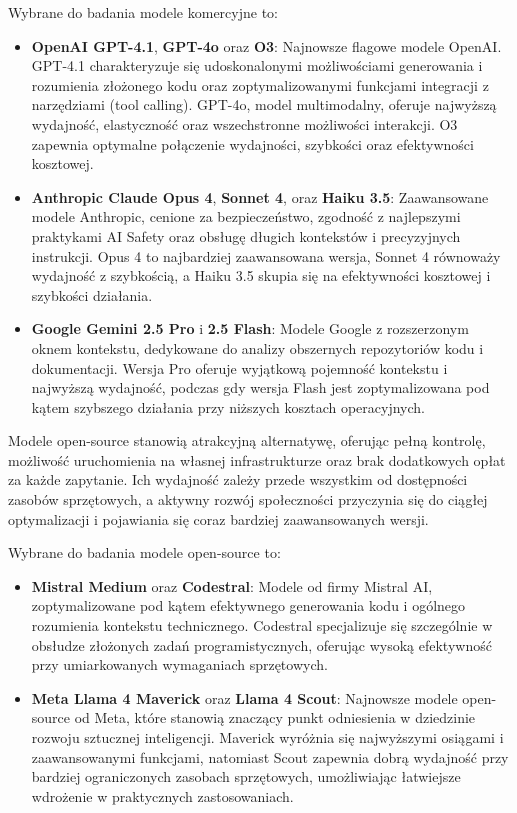 Wybrane do badania modele komercyjne to:

\begin{itemize}
	\item \textbf{OpenAI GPT-4.1}, \textbf{GPT-4o} oraz \textbf{O3}: Najnowsze flagowe modele OpenAI. GPT-4.1 charakteryzuje się udoskonalonymi możliwościami generowania i rozumienia złożonego kodu oraz zoptymalizowanymi funkcjami integracji z narzędziami (tool calling). GPT-4o, model multimodalny, oferuje najwyższą wydajność, elastyczność oraz wszechstronne możliwości interakcji. O3 zapewnia optymalne połączenie wydajności, szybkości oraz efektywności kosztowej.
	\item \textbf{Anthropic Claude Opus 4}, \textbf{Sonnet 4}, oraz \textbf{Haiku 3.5}: Zaawansowane modele Anthropic, cenione za bezpieczeństwo, zgodność z najlepszymi praktykami AI Safety oraz obsługę długich kontekstów i precyzyjnych instrukcji. Opus 4 to najbardziej zaawansowana wersja, Sonnet 4 równoważy wydajność z szybkością, a Haiku 3.5 skupia się na efektywności kosztowej i szybkości działania.
	\item \textbf{Google Gemini 2.5 Pro} i \textbf{2.5 Flash}: Modele Google z rozszerzonym oknem kontekstu, dedykowane do analizy obszernych repozytoriów kodu i dokumentacji. Wersja Pro oferuje wyjątkową pojemność kontekstu i najwyższą wydajność, podczas gdy wersja Flash jest zoptymalizowana pod kątem szybszego działania przy niższych kosztach operacyjnych.
\end{itemize}

Modele open-source stanowią atrakcyjną alternatywę, oferując pełną kontrolę, możliwość uruchomienia na własnej infrastrukturze oraz brak dodatkowych opłat za każde zapytanie. Ich wydajność zależy przede wszystkim od dostępności zasobów sprzętowych, a aktywny rozwój społeczności przyczynia się do ciągłej optymalizacji i pojawiania się coraz bardziej zaawansowanych wersji.

Wybrane do badania modele open-source to:

\begin{itemize}
	\item \textbf{Mistral Medium} oraz \textbf{Codestral}: Modele od firmy Mistral AI, zoptymalizowane pod kątem efektywnego generowania kodu i ogólnego rozumienia kontekstu technicznego. Codestral specjalizuje się szczególnie w obsłudze złożonych zadań programistycznych, oferując wysoką efektywność przy umiarkowanych wymaganiach sprzętowych.
	\item \textbf{Meta Llama 4 Maverick} oraz \textbf{Llama 4 Scout}: Najnowsze modele open-source od Meta, które stanowią znaczący punkt odniesienia w dziedzinie rozwoju sztucznej inteligencji. Maverick wyróżnia się najwyższymi osiągami i zaawansowanymi funkcjami, natomiast Scout zapewnia dobrą wydajność przy bardziej ograniczonych zasobach sprzętowych, umożliwiając łatwiejsze wdrożenie w praktycznych zastosowaniach.
\end{itemize}

